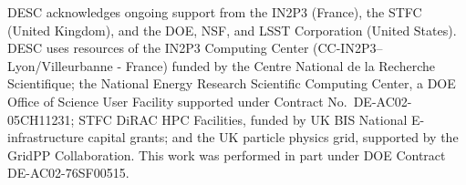 DESC acknowledges ongoing support from the IN2P3 (France), the STFC 
(United Kingdom), and the DOE, NSF, and LSST Corporation (United States).  
DESC uses resources of the IN2P3 Computing Center 
(CC-IN2P3--Lyon/Villeurbanne - France) funded by the Centre National de la
Recherche Scientifique; the National Energy Research Scientific Computing
Center, a DOE Office of Science User Facility supported under Contract 
No.\ DE-AC02-05CH11231; STFC DiRAC HPC Facilities, funded by UK BIS National 
E-infrastructure capital grants; and the UK particle physics grid, supported
by the GridPP Collaboration.  This work was performed in part under DOE 
Contract DE-AC02-76SF00515.
